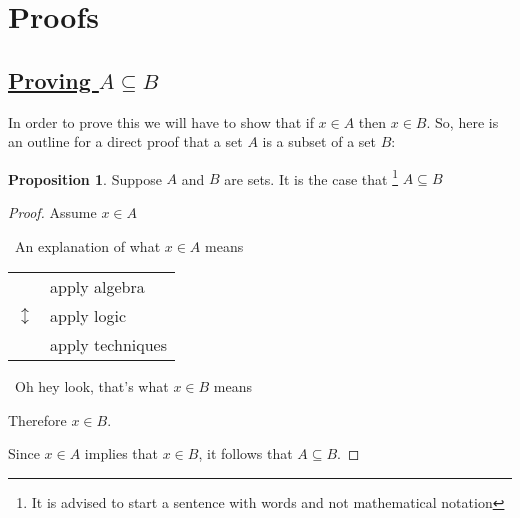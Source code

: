 \documentclass{amsart} %
\theoremstyle{definition} %
\theoremstyle{proposition} %
\newtheorem*{prpn}{Proposition}
\theoremstyle{remark} %
\begin{document}
\bigskip \bigskip \bigskip \bigskip \bigskip

\section{\textbf{Proofs}}

\subsection{\underline{Proving $A \subseteq B$}}

\bigskip

In order to prove this we will have to show that if $x \in A$ then $x \in B$. So, here is an outline for a direct proof that a set $A$ is a subset of a set $B$:

\begin{prpn}
Suppose $A$ and $B$ are sets. It is the case that \footnote{It is advised to start a sentence with words and not mathematical notation} $A \subseteq B$
\end{prpn}

\begin{proof}
Assume $x \in A$

      \begin{center}
            \guillemotleft\ An explanation of what $ x \in A$ means \guillemotright
      \end{center}

      \begin{center}
      \begin{tabular}{r l}
            \multirow{3}{*}{\huge $\updownarrow$} & apply algebra \\ %
            & apply logic \\
            & apply techniques \\
      \end{tabular}
      \end{center}

      \begin{center}
            \guillemotleft\ Oh hey look, that's what $x \in B$ means \guillemotright
      \end{center}

      Therefore $x \in B$.

      Since $x \in A$ implies that $x \in B$, it follows that $A \subseteq B$.

\end{proof}
\end{document}
